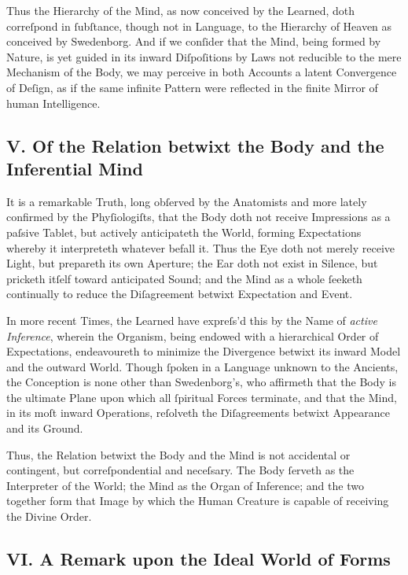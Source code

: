 \documentclass[12pt]{article}
\begin{document}
Thus the Hierarchy of the Mind, as now conceived by the Learned, doth 
correſpond in ſubſtance, though not in Language, to the Hierarchy of Heaven 
as conceived by Swedenborg. And if we conſider that the Mind, being formed 
by Nature, is yet guided in its inward Diſpoſitions by Laws not reducible to 
the mere Mechanism of the Body, we may perceive in both Accounts a latent 
Convergence of Deſign, as if the same infinite Pattern were reflected in the 
finite Mirror of human Intelligence.

\subsection*{V. Of the Relation betwixt the Body and the Inferential Mind}

It is a remarkable Truth, long obſerved by the Anatomists and more lately 
confirmed by the Phyſiologiſts, that the Body doth not receive Impressions 
as a paſsive Tablet, but actively anticipateth the World, forming 
Expectations whereby it interpreteth whatever befall it. Thus the Eye doth 
not merely receive Light, but prepareth its own Aperture; the Ear doth not 
exist in Silence, but pricketh itſelf toward anticipated Sound; and the Mind 
as a whole ſeeketh continually to reduce the Diſagreement betwixt Expectation 
and Event.

In more recent Times, the Learned have expreſs’d this by the Name of 
\textit{active Inference}, wherein the Organism, being endowed with a 
hierarchical Order of Expectations, endeavoureth to minimize the Divergence 
betwixt its inward Model and the outward World. Though ſpoken in a Language 
unknown to the Ancients, the Conception is none other than Swedenborg’s, 
who affirmeth that the Body is the ultimate Plane upon which all 
ſpiritual Forces terminate, and that the Mind, in its moſt inward Operations, 
reſolveth the Diſagreements betwixt Appearance and its Ground.

Thus, the Relation betwixt the Body and the Mind is not accidental or 
contingent, but correſpondential and neceſsary. The Body ſerveth as the 
Interpreter of the World; the Mind as the Organ of Inference; and the two 
together form that Image by which the Human Creature is capable of receiving 
the Divine Order.

\subsection*{VI. A Remark upon the Ideal World of Forms}
\end{document}
